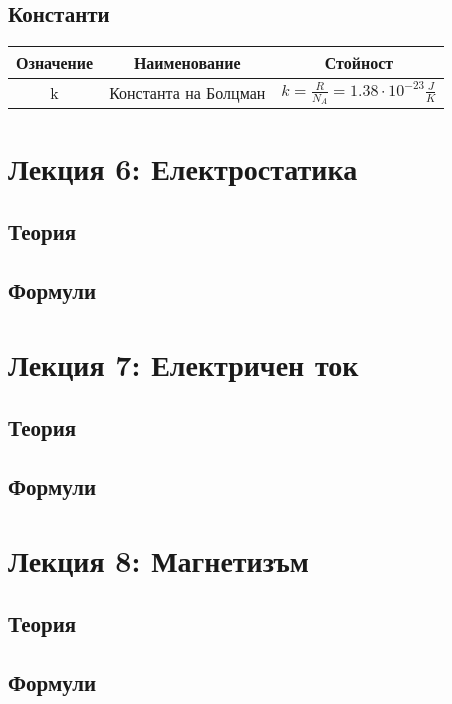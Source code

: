 \documentclass[fleqn, 12pt]{article}
\theoremstyle{definition}
\begin{document}
\newpage
\subsection{Константи}

\begin{center}
\begin{tabular}{ |c|c|c|}
\hline
\textbf{Означение} & \textbf{Наименование}&\textbf{Стойност}\\
\hline
k & Константа на Болцман & $k = \frac{R}{N_A} = 1.38 \cdot 10^{-23} \frac{J}{K}$ \\
\hline
\end{tabular}
\end{center}

\newpage
\section{Лекция 6: Електростатика}

\subsection{Теория}

\newpage
\subsection{Формули}


\newpage
\section{Лекция 7: Електричен ток}

\subsection{Теория}

\newpage
\subsection{Формули}

\newpage
\section{Лекция 8: Магнетизъм}

\subsection{Теория}

\newpage
\subsection{Формули}
\end{document}
